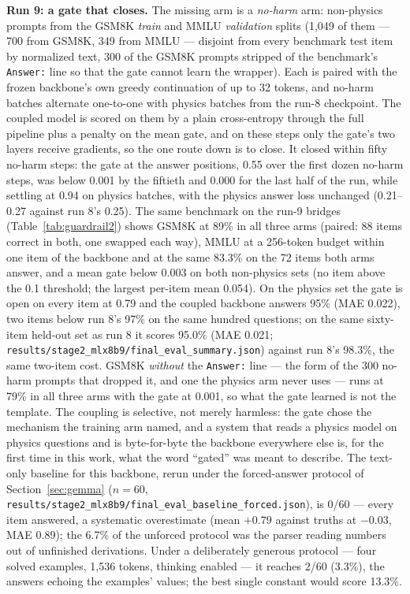 \documentclass[11pt]{article}
\newcommand{\code}[1]{\texttt{#1}}
\begin{document}
\textbf{Run 9: a gate that closes.} The missing arm is a \emph{no-harm} arm: non-physics prompts from the GSM8K \emph{train} and MMLU \emph{validation} splits (1,049 of them --- 700 from GSM8K, 349 from MMLU --- disjoint from every benchmark test item by normalized text, 300 of the GSM8K prompts stripped of the benchmark's \code{Answer:} line so that the gate cannot learn the wrapper). Each is paired with the frozen backbone's own greedy continuation of up to 32 tokens, and no-harm batches alternate one-to-one with physics batches from the run-8 checkpoint. The coupled model is scored on them by a plain cross-entropy through the full pipeline plus a penalty on the mean gate, and on these steps only the gate's two layers receive gradients, so the one route down is to close. It closed within fifty no-harm steps: the gate at the answer positions, 0.55 over the first dozen no-harm steps, was below 0.001 by the fiftieth and 0.000 for the last half of the run, while settling at 0.94 on physics batches, with the physics answer loss unchanged (0.21--0.27 against run 8's 0.25). The same benchmark on the run-9 bridges (Table~\ref{tab:guardrail2}) shows GSM8K at 89\% in all three arms (paired: 88 items correct in both, one swapped each way), MMLU at a 256-token budget within one item of the backbone and at the same 83.3\% on the 72 items both arms answer, and a mean gate below $0.003$ on both non-physics sets (no item above the 0.1 threshold; the largest per-item mean 0.054). On the physics set the gate is open on every item at 0.79 and the coupled backbone answers 95\% (MAE 0.022), two items below run 8's 97\% on the same hundred questions; on the same sixty-item held-out set as run 8 it scores 95.0\% (MAE 0.021; \code{results/stage2\_mlx8b9/final\_eval\_summary.json}) against run 8's 98.3\%, the same two-item cost. GSM8K \emph{without} the \code{Answer:} line --- the form of the 300 no-harm prompts that dropped it, and one the physics arm never uses --- runs at 79\% in all three arms with the gate at 0.001, so what the gate learned is not the template. The coupling is selective, not merely harmless: the gate chose the mechanism the training arm named, and a system that reads a physics model on physics questions and is byte-for-byte the backbone everywhere else is, for the first time in this work, what the word ``gated'' was meant to describe. The text-only baseline for this backbone, rerun under the forced-answer protocol of Section~\ref{sec:gemma} ($n{=}60$, \code{results/stage2\_mlx8b9/final\_eval\_baseline\_forced.json}), is 0/60 --- every item answered, a systematic overestimate (mean $+0.79$ against truths at $-0.03$, MAE 0.89); the 6.7\% of the unforced protocol was the parser reading numbers out of unfinished derivations. Under a deliberately generous protocol --- four solved examples, 1,536 tokens, thinking enabled --- it reaches 2/60 (3.3\%), the answers echoing the examples' values; the best single constant would score 13.3\%.
\end{document}

